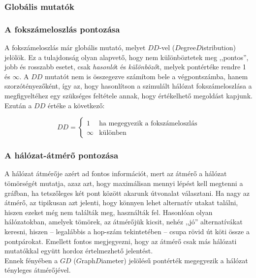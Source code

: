     \subsubsection{Globális mutatók}
    \subsubsection{A fokszámeloszlás pontozása}
    A fokszámeloszlás már globális mutató, melyet $DD$-vel ($D$egree$D$istribution) jelölök. Ez a tulajdonság olyan alapvető, hogy nem különböztetek meg ,,pontos'', jobb és rosszabb esetet, csak \textit{hasonló}t és \textit{különböző}t, melyek pontértéke rendre 1 és $\infty$. A $DD$ mutatót nem is összegezve számítom bele a végpontszámba, hanem szorzótényezőként, így az, hogy hasonlítson a szimulált hálózat fokszámeloszlása a megfigyeltéhez egy szükséges feltétele annak, hogy értékelhető megoldást kapjunk. Ezután a $DD$ értéke a következő:

    $$DD =
    \begin{cases}
      1 & \text{ha megegyezik a fokszámeloszlás}\\
      \infty & \text{különben}
    \end{cases}$$

    \subsubsection{A hálózat-átmérő pontozása}
    A hálózat átmérője azért ad fontos információt, mert az átmérő a hálózat tömörségét mutatja, azaz azt, hogy maximálisan mennyi lépést kell megtenni a gráfban, ha tetszőleges két pont között akarunk útvonalat választani. Ha nagy az átmérő, az tipikusan azt jelenti, hogy könnyen lehet alternatív utakat találni, hiszen ezeket még nem találták meg, használták fel. Hasonlóan olyan hálózatokban, amelyek tömörek, az átmérőjük kicsit, nehéz ,,jó'' alternatívákat keresni, hiszen -- legalábbis a hop-szám tekintetében -- csupa rövid út köti össze a pontpárokat. Emellett fontos megjegyezni, hogy az átmérő csak más hálózati mutatókkal együtt hordoz értelmezhető jelentést.\\
    Ennek fényében a $GD$ ($G$raph$D$iameter) jelölésű pontérték megegyezik a hálózat tényleges átmérőjével.

